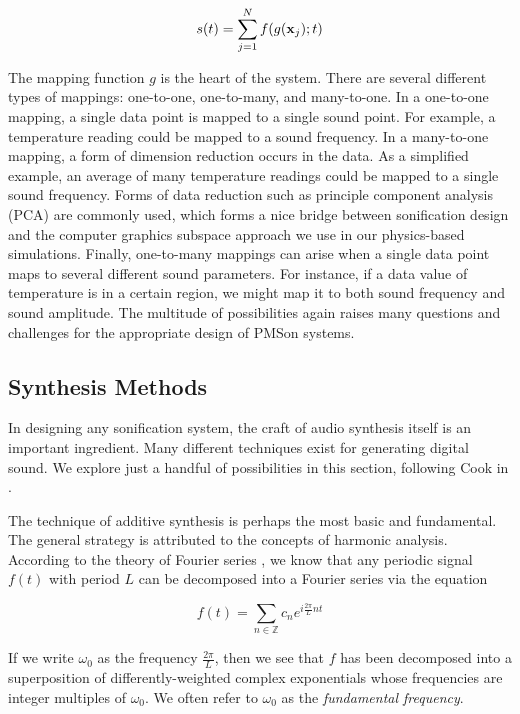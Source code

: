 \begin{equation}
s(t) = \sum_{j=1}^N f(g(\mathbf{x}_j); t)
\end{equation}

The mapping function $g$ is the heart of the system. There are several 
different types of mappings: one-to-one, one-to-many, and many-to-one. In a 
one-to-one mapping, a single data point is mapped to a single sound point. 
For example, a temperature reading could be mapped to a sound frequency. In a 
many-to-one mapping, a form of dimension reduction occurs in the data. As a 
simplified example, an average of many temperature readings could be mapped 
to a single sound frequency. Forms of data reduction such as principle 
component analysis (PCA) are commonly used, which forms a nice bridge between 
sonification design and the computer graphics subspace approach we use in our 
physics-based simulations. Finally, one-to-many mappings can arise when a 
single data point maps to several different sound parameters. For instance, 
if a data value of temperature is in a certain region, we might map it to 
both sound frequency and sound amplitude. The multitude of possibilities 
again raises many questions and challenges for the appropriate design of 
PMSon systems.

\subsection{Synthesis Methods}
\label{sec:synthesis-methods}
In designing any sonification system, the craft of audio synthesis itself is 
an important ingredient. Many different techniques exist for generating 
digital sound. We explore just a handful of possibilities in this section, following Cook in \cite{hermann2011sonification}.

The technique of additive synthesis is perhaps the most basic and 
fundamental. The general strategy is attributed to the concepts of harmonic 
analysis. According to the theory of Fourier series \cite{katznelson2004introduction}, we know that any 
periodic signal $f(t)$ with period $L$ can be decomposed into a Fourier 
series via the equation

\begin{equation}
f(t) = \sum_{n \in \mathbb{Z}} c_n e^{i\frac{2\pi}{L}nt}
\end{equation}

If we write $\omega_0$ as the frequency $\frac{2\pi}{L}$, then we see that $f$
 has been decomposed into a superposition of differently-weighted complex 
exponentials whose frequencies are integer multiples of $\omega_0$. We often 
refer to $\omega_0$ as the {\em fundamental frequency}. 

